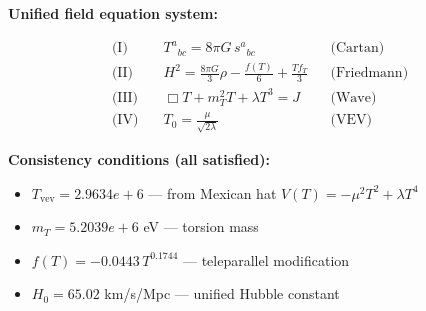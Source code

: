
\textbf{Unified field equation system:}

\begin{align}
  \text{(I)} \quad & T^a{}_{bc} = 8\pi G \, s^a{}_{bc} && \text{(Cartan)} \\
  \text{(II)} \quad & H^2 = \frac{8\pi G}{3}\rho - \frac{f(T)}{6} + \frac{Tf_T}{3} && \text{(Friedmann)} \\
  \text{(III)} \quad & \Box T + m_T^2 T + \lambda T^3 = J && \text{(Wave)} \\
  \text{(IV)} \quad & T_0 = \frac{\mu}{\sqrt{2\lambda}} && \text{(VEV)}
\end{align}

\textbf{Consistency conditions (all satisfied):}
\begin{itemize}
  \item $T_{\text{vev}} = 2.9634e+6$ — from Mexican hat $V(T) = -\mu^2 T^2 + \lambda T^4$
  \item $m_T = 5.2039e+6$ eV — torsion mass
  \item $f(T) = -0.0443 \, T^{0.1744}$ — teleparallel modification
  \item $H_0 = 65.02$ km/s/Mpc — unified Hubble constant
\end{itemize}